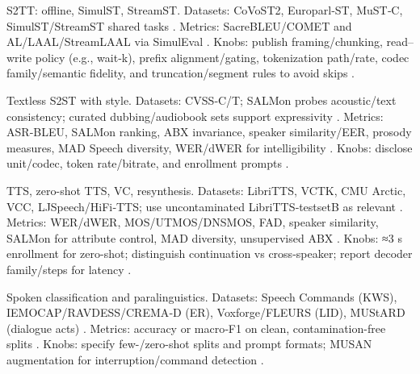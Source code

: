\documentclass{article}
\begin{document}
S2TT: offline, SimulST, StreamST. Datasets: CoVoST2, Europarl‑ST, MuST‑C, SimulST/StreamST shared tasks \cite{guo2025streamuniachievingstreamingspeechtransla,chen2024bestowefficientstreamablespeechlanguagem}. Metrics: SacreBLEU/COMET and AL/LAAL/StreamLAAL via SimulEval \cite{guo2025streamuniachievingstreamingspeechtransla}. Knobs: publish framing/chunking, read–write policy (e.g., wait‑k), prefix alignment/gating, tokenization path/rate, codec family/semantic fidelity, and truncation/segment rules to avoid skips \cite{ye2024codecdoesmatterexploringsemanticshortcom,zhao2024textlessstreamingspeechtranslationsemant}.

Textless S2ST with style. Datasets: CVSS‑C/T; SALMon probes acoustic/text consistency; curated dubbing/audiobook sets support expressivity \cite{maimon2025salmonsuiteacousticlanguagemodelevaluati,huang2023holisticcascadesystembenchmarkhumanevalu}. Metrics: ASR‑BLEU, SALMon ranking, ABX invariance, speaker similarity/EER, prosody measures, MAD Speech diversity, WER/dWER for intelligibility \cite{fily2024establishingdegreesclosenessbetweenaudio,futeral2025madspeechmeasuresacousticdiversity,qian2025prosodylmuncoveringemergingprosodyproces,wang2024whydospeechlanguagemodelsfailgeneratesem}. Knobs: disclose unit/codec, token rate/bitrate, and enrollment prompts \cite{peng2024mslms2stmultitaskspeechlanguagemodeltext}.

TTS, zero-shot TTS, VC, resynthesis. Datasets: LibriTTS, VCTK, CMU Arctic, VCC, LJSpeech/HiFi‑TTS; use uncontaminated LibriTTS‑testsetB as relevant \cite{turetzky2024lastlanguagemodelawarespeechtokenization,tseng2025evaluationllmsspeechisoftenflawedtestset}. Metrics: WER/dWER, MOS/UTMOS/DNSMOS, FAD, speaker similarity, SALMon for attribute control, MAD diversity, unsupervised ABX \cite{maimon2025salmonsuiteacousticlanguagemodelevaluati,futeral2025madspeechmeasuresacousticdiversity,fily2024establishingdegreesclosenessbetweenaudio,verma2024whispergpthybridrepresentationaudiolarge}. Knobs: ≈3 s enrollment for zero-shot; distinguish continuation vs cross-speaker; report decoder family/steps for latency \cite{wang2024evaluatingtextspeechsynthesislargediscre}.

Spoken classification and paralinguistics. Datasets: Speech Commands (KWS), IEMOCAP/RAVDESS/CREMA‑D (ER), Voxforge/FLEURS (LID), MUStARD (dialogue acts) \cite{hsu2024exploringcontextlearningtextlessspeechla}. Metrics: accuracy or macro‑F1 on clean, contamination-free splits \cite{tseng2025evaluationllmsspeechisoftenflawedtestset}. Knobs: specify few-/zero-shot splits and prompt formats; MUSAN augmentation for interruption/command detection \cite{ma2024languagemodelcanlistenwhilespeaking}.
\end{document}
